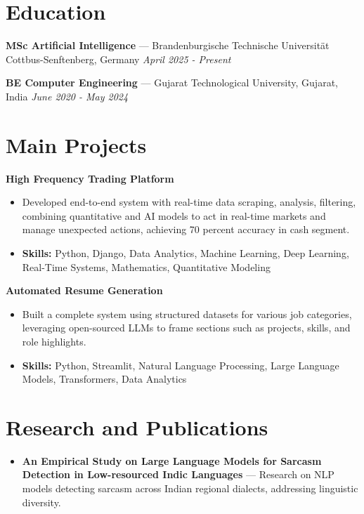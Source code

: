 \documentclass[a4paper,10pt]{article}
\begin{document}
\section*{Education}
\textbf{MSc Artificial Intelligence} — Brandenburgische Technische Universität Cottbus-Senftenberg, Germany \hfill \textit{April 2025 - Present}\par
\vspace{1.5pt}
\textbf{BE Computer Engineering} — Gujarat Technological University, Gujarat, India \hfill \textit{June 2020 - May 2024}\par

\section*{Main Projects}
\textbf{High Frequency Trading Platform}\par
\vspace{1pt}
\begin{itemize}
  \item Developed end-to-end system with real-time data scraping, analysis, filtering, combining quantitative and AI models to act in real-time markets and manage unexpected actions, achieving 70 percent accuracy in cash segment.
  \item \textbf{Skills:} Python, Django, Data Analytics, Machine Learning, Deep Learning, Real-Time Systems, Mathematics, Quantitative Modeling
\end{itemize}
\vspace{3pt}
\textbf{Automated Resume Generation}\par
\vspace{1pt}
\begin{itemize}
  \item Built a complete system using structured datasets for various job categories, leveraging open-sourced LLMs to frame sections such as projects, skills, and role highlights.
  \item \textbf{Skills:} Python, Streamlit, Natural Language Processing, Large Language Models, Transformers, Data Analytics
\end{itemize}

\section*{Research and Publications}
\begin{itemize}
\item \textbf{An Empirical Study on Large Language Models for Sarcasm Detection in Low-resourced Indic Languages} — Research on NLP models detecting sarcasm across Indian regional dialects, addressing linguistic diversity.
\end{itemize}
\end{document}
